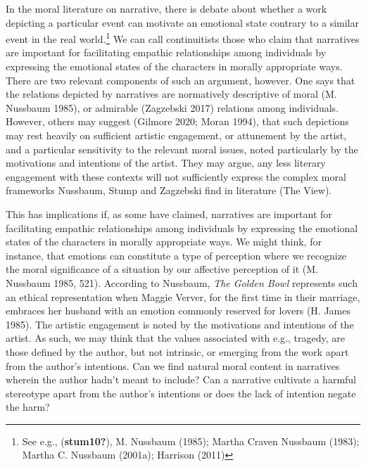 \documentclass[12pt]{book}
\theoremstyle{definition}
\theoremstyle{remark}
\begin{document}
In the moral literature on narrative, there is debate about whether a work depicting a particular event can motivate an emotional state contrary to a similar event in the real world.\footnote{See e.g., (\textbf{stum10?}), M. Nussbaum (1985); Martha Craven Nussbaum (1983); Martha C. Nussbaum (2001a); Harrison (2011)} We can call continuitists those who claim that narratives are important for facilitating empathic relationships among individuals by expressing the emotional states of the characters in morally appropriate ways. There are two relevant components of such an argument, however. One says that the relations depicted by narratives are normatively descriptive of moral (M. Nussbaum 1985), or admirable (Zagzebski 2017) relations among individuals. However, others may suggest (Gilmore 2020; Moran 1994), that such depictions may rest heavily on sufficient artistic engagement, or attunement by the artist, and a particular sensitivity to the relevant moral issues, noted particularly by the motivations and intentions of the artist. They may argue, any less literary engagement with these contexts will not sufficiently express the complex moral frameworks Nussbaum, Stump and Zagzebski find in literature (The View).

This has implications if, as some have claimed, narratives are important for facilitating empathic relationships among individuals by expressing the emotional states of the characters in morally appropriate ways. We might think, for instance, that emotions can constitute a type of perception where we recognize the moral significance of a situation by our affective perception of it (M. Nussbaum 1985, 521). According to Nussbaum, \emph{The Golden Bowl} represents such an ethical representation when Maggie Verver, for the first time in their marriage, embraces her husband with an emotion commonly reserved for lovers (H. James 1985). The artistic engagement is noted by the motivations and intentions of the artist. As such, we may think that the values associated with e.g., tragedy, are those defined by the author, but not intrinsic, or emerging from the work apart from the author's intentions. Can we find natural moral content in narratives wherein the author hadn't meant to include? Can a narrative cultivate a harmful stereotype apart from the author's intentions or does the lack of intention negate the harm?
\end{document}
